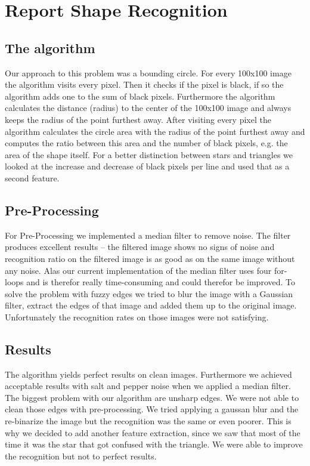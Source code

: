 \documentclass[a4paper, 10pt]{article}
\begin{document}
	\section{Report Shape Recognition}
	
	\subsection{The algorithm}
	
	\par{Our approach to this problem was a bounding circle. For every 100x100 image the algorithm visits every pixel. Then it checks if the pixel is black, if so the algorithm adds one to the sum of black pixels. Furthermore the algorithm calculates the distance (radius) to the center of the 100x100 image and always keeps the radius of the point furthest away. After visiting every pixel the algorithm calculates the circle area with the radius of the point furthest away and computes the ratio between this area and the number of black pixels, e.g. the area of the shape itself. For a better distinction between stars and triangles we looked at the increase and decrease of black pixels per line and used that as a second feature.}
	
	\subsection{Pre-Processing}
	
	\par{For Pre-Processing we implemented a median filter to remove noise. The filter produces excellent results – the filtered image shows no signs of noise and recognition ratio on the filtered image is as good as on the same image without any noise. Alas our current implementation of the median filter uses four for-loops and is therefor really time-consuming and could therefor be improved. To solve the problem with fuzzy edges we tried to blur the image with a Gaussian filter, extract the edges of that image and added them up to the original image. Unfortunately the recognition rates on those images were not satisfying.}
	
	\subsection{Results}
	
	\par{The algorithm yields perfect results on clean images. Furthermore we achieved acceptable results with salt and pepper noise when we applied a median filter. The biggest problem with our algorithm are unsharp edges. We were not able to clean those edges with pre-processing. We tried applying a gaussan blur and the re-binarize the image but the recognition was the same or even poorer. This is why we decided to add another feature extraction, since we saw that most of the time it was the star that got confused with the triangle. We were able to improve the recognition but not to perfect results.}
\end{document}
